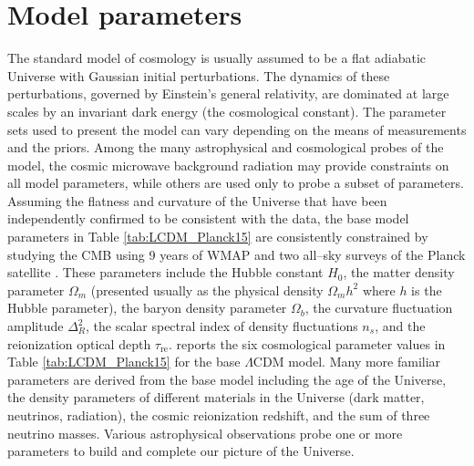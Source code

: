 \documentclass[a4wide,12pt]{book}
\begin{document}
{\section{Model parameters}
\label{subsec:Model_parameters}
The standard model of cosmology is usually assumed to be a flat adiabatic Universe with Gaussian initial perturbations.  The dynamics of these perturbations, governed by Einstein's general relativity, are dominated at large scales by an invariant dark energy (the cosmological constant). The parameter sets used to present the model can vary depending on the means of measurements and the priors. Among the many astrophysical and cosmological probes of the model, the cosmic microwave background radiation may provide constraints on all model parameters, while others are used only to probe a subset of parameters. Assuming the flatness and curvature of the Universe that have been independently confirmed to be consistent with the data, the base model parameters in Table \ref{tab:LCDM_Planck15} are consistently constrained by studying the CMB using 9 years of WMAP \citep[][]{WMAP9} and two all--sky surveys of the Planck satellite \citep[][]{Planck2015}. These parameters include the Hubble constant $H_0$, the matter density parameter $\Omega_m$ (presented usually as the physical density $\Omega_m h^2$ where $h$ is the Hubble parameter), the baryon density parameter $\Omega_b$, the curvature fluctuation amplitude $\Delta^2_R$, the scalar spectral index of density fluctuations $n_s$, and the reionization optical depth $\tau_\mathrm{re}$. \citet[][]{Planck2015} reports the six cosmological parameter values in Table \ref{tab:LCDM_Planck15} for the base $\Lambda$CDM model. Many more familiar parameters are derived from the base model including the age of the Universe, the density parameters of different materials in the Universe (dark matter, neutrinos, radiation), the cosmic reionization redshift, and the sum of three neutrino masses. Various astrophysical observations probe one or more parameters to build and complete our picture of the Universe.

}
\end{document}
